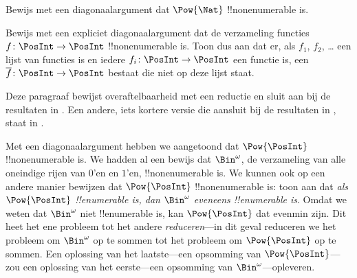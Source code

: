 \documentclass[openany]{memoir}
\begin{document}
\begin{prob}
Bewijs met een diagonaalargument dat $\Pow{\Nat}$ !!{nonenumerable} is.
\end{prob}

\begin{prob}\label{sfr:siz:nen:prob:f-posint}
Bewijs met een expliciet diagonaalargument dat de verzameling functies
$f \colon \PosInt \to \PosInt$ !!{nonenumerable} is. Toon dus aan dat er,
als $f_1$, $f_2$, \dots{} een lijst van functies is en iedere $f_i\colon
\PosInt \to \PosInt$ een functie is, een $\overline{f}\colon \PosInt \to \PosInt$
bestaat die niet op deze lijst staat.
\end{prob}
\endgroup

\begingroup
\def\olfilename{OLP-0034}
\def\olfilepath{content/sets-functions-relations/size-of-sets/}
\hypertarget{unit-OLP-0034}{}





\begin{editorial}
  Deze paragraaf bewijst overaftelbaarheid met een reductie en sluit aan bij
  de resultaten in . Een andere, iets kortere versie die
  aansluit bij de resultaten in
  , staat in .
\end{editorial}

Met een diagonaalargument hebben we aangetoond dat $\Pow{\PosInt}$
!!{nonenumerable} is. We hadden al een bewijs dat $\Bin^\omega$, de
verzameling van alle oneindige rijen van $0$'en en $1$'en,
!!{nonenumerable} is. We kunnen ook op een andere manier bewijzen dat
$\Pow{\PosInt}$ !!{nonenumerable} is: toon aan dat \emph{als
$\Pow{\PosInt}$ !!{enumerable} is, dan $\Bin^\omega$ eveneens
!!{enumerable} is}. Omdat we weten dat $\Bin^\omega$ niet
!!{enumerable} is, kan $\Pow{\PosInt}$ dat evenmin zijn. Dit heet het
ene probleem tot het andere \emph{reduceren}---in dit geval reduceren we
het probleem om $\Bin^\omega$ op te sommen tot het probleem om
$\Pow{\PosInt}$ op te sommen. Een oplossing van het laatste---een
opsomming van $\Pow{\PosInt}$---zou een oplossing van het eerste---een
opsomming van $\Bin^\omega$---opleveren.
\end{document}
